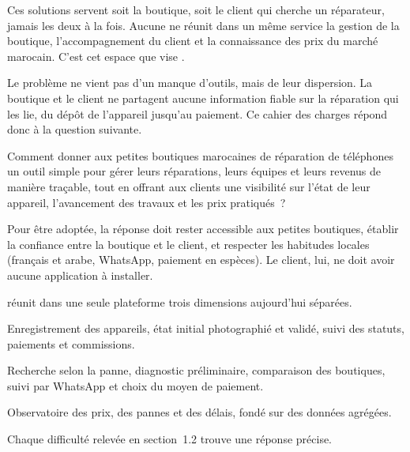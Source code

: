 Ces solutions servent soit la boutique, soit le client qui cherche un réparateur, jamais les deux à la fois. Aucune ne réunit dans un même service la gestion de la boutique, l’accompagnement du client et la connaissance des prix du marché marocain. C’est cet espace que vise \docapp.


Le problème ne vient pas d’un manque d’outils, mais de leur dispersion. La boutique et le client ne partagent aucune information fiable sur la réparation qui les lie, du dépôt de l’appareil jusqu’au paiement. Ce cahier des charges répond donc à la question suivante.

\begin{cdcquestion}
Comment donner aux petites boutiques marocaines de réparation de téléphones un outil simple pour gérer leurs réparations, leurs équipes et leurs revenus de manière traçable, tout en offrant aux clients une visibilité sur l’état de leur appareil, l’avancement des travaux et les prix pratiqués~?
\end{cdcquestion}

Pour être adoptée, la réponse doit rester accessible aux petites boutiques, établir la confiance entre la boutique et le client, et respecter les habitudes locales (français et arabe, WhatsApp, paiement en espèces). Le client, lui, ne doit avoir aucune application à installer.


\docapp{} réunit dans une seule plateforme trois dimensions aujourd’hui séparées.

\begin{cdcdefinitions}
  \item[Gestion de la boutique] Enregistrement des appareils, état initial photographié et validé, suivi des statuts, paiements et commissions.
  \item[Expérience du client] Recherche selon la panne, diagnostic préliminaire, comparaison des boutiques, suivi par WhatsApp et choix du moyen de paiement.
  \item[Analyse du marché] Observatoire des prix, des pannes et des délais, fondé sur des données agrégées.
\end{cdcdefinitions}

Chaque difficulté relevée en section~1.2 trouve une réponse précise.


